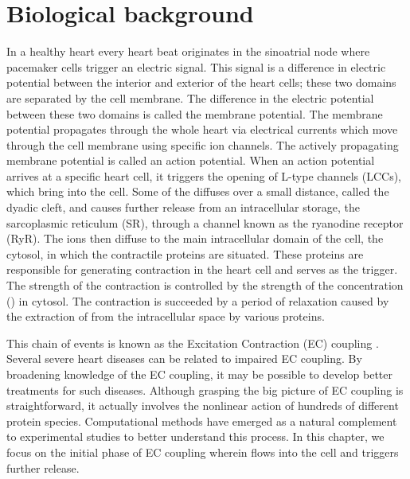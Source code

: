 \section{Biological background}

In a healthy heart every heart beat originates in the sinoatrial node
where pacemaker cells trigger an electric signal. This signal is a
difference in electric potential between the interior and exterior of
the heart cells; these two domains are separated by the cell
membrane. The difference in the electric potential between these two
domains is called the membrane potential. The membrane potential
propagates through the whole heart via electrical currents which move
through the cell membrane using specific ion channels. The actively
propagating membrane potential is called an action potential. When an
action potential arrives at a specific heart cell, it triggers the
opening of L-type \Ca channels (LCCs), which bring \Ca into the
cell. Some of the \Ca diffuses over a small distance, called the
dyadic cleft, and causes further \Ca release from an intracellular \Ca
storage, the sarcoplasmic reticulum (SR), through a channel known as
the ryanodine receptor (RyR). The \Ca ions then diffuse to the main
intracellular domain of the cell, the cytosol, in which the
contractile proteins are situated. These proteins are responsible for
generating contraction in the heart cell and \Ca serves as the
trigger. The strength of the contraction is controlled by the strength
of the \Ca concentration (\CaC) in cytosol. The contraction is
succeeded by a period of relaxation caused by the extraction of \Ca
from the intracellular space by various proteins.

This chain of events is known as the Excitation Contraction (EC)
coupling \citep{Bers2001}. Several severe heart diseases can be related
to impaired EC coupling. By broadening knowledge of the EC coupling,
it may be possible to develop better treatments for such
diseases. Although grasping the big picture of EC coupling is
straightforward, it actually involves the nonlinear action of hundreds
of different protein species. Computational methods have emerged as a
natural complement to experimental studies to better understand this
process. In this chapter, we focus on the initial phase of EC
coupling wherein \Ca flows into the cell and triggers further \Ca
release.

